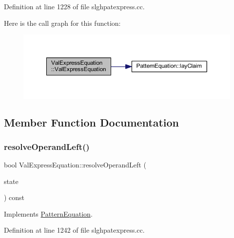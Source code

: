 Definition at line 1228 of file slghpatexpress.\+cc.

Here is the call graph for this function\+:
\nopagebreak
\begin{figure}[H]
\begin{center}
\leavevmode
\includegraphics[width=350pt]{class_val_express_equation_ae2ba4d8d94c4c9d19eb64fd51af0b0bd_cgraph}
\end{center}
\end{figure}


\subsection{Member Function Documentation}
\mbox{\label{class_val_express_equation_ad13fa9a79e7ff80ed63b0c0e12f395ab}} 
\subsubsection{\texorpdfstring{resolveOperandLeft()}{resolveOperandLeft()}}
{\footnotesize\ttfamily bool Val\+Express\+Equation\+::resolve\+Operand\+Left (\begin{DoxyParamCaption}\item[{\mbox{\hyperlink{struct_operand_resolve}{Operand\+Resolve}} \&}]{state }\end{DoxyParamCaption}) const\hspace{0.3cm}{\ttfamily [virtual]}}



Implements \mbox{\hyperlink{class_pattern_equation_a16e885a945df91e3daf2dea6394ae6f2}{Pattern\+Equation}}.



Definition at line 1242 of file slghpatexpress.\+cc.

